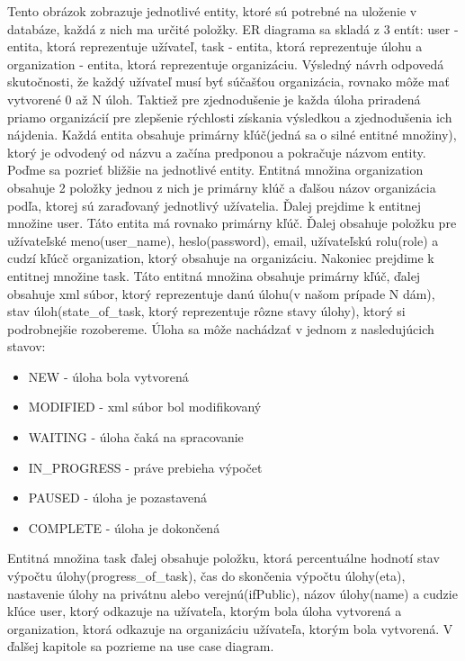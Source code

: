 Tento obrázok zobrazuje jednotlivé entity, ktoré sú potrebné na uloženie v databáze, každá z nich ma určité položky. ER diagrama sa skladá z 3 entít: user - entita, ktorá reprezentuje užívateľ, task - entita, ktorá reprezentuje úlohu a organization - entita, ktorá reprezentuje organizáciu. Výsledný návrh odpovedá skutočnosti, že každý užívateľ musí byť súčašťou organizácia, rovnako môže mať vytvorené 0 až N úloh. Taktiež pre zjednodušenie je každa úloha priradená priamo organizácií pre zlepšenie rýchlosti získania výsledkou a zjednodušenia ich nájdenia. Každá entita obsahuje primárny kľúč(jedná sa o silné entitné množiny), ktorý je odvodený od názvu a začína predponou  a pokračuje názvom entity. Poďme sa pozrieť bližšie na jednotlivé entity. Entitná množina organization obsahuje 2 položky jednou z nich je primárny klúč a ďalšou názov organizácia podľa, ktorej sú zaraďovaný jednotlivý užívatelia. Ďalej prejdime k entitnej množine user. Táto entita má rovnako primárny kľúč. Ďalej obsahuje položku pre užívateľské meno(user\_name), heslo(password), email, užívateľskú rolu(role) a cudzí kľúcč organization, ktorý obsahuje na organizáciu. Nakoniec prejdime k entitnej množine task. Táto entitná množina obsahuje primárny kľúč, ďalej obsahuje xml súbor, ktorý reprezentuje danú úlohu(v našom prípade N dám), stav úloh(state\_of\_task, ktorý reprezentuje rôzne stavy úlohy), ktorý si podrobnejšie rozobereme. Úloha sa môže nachádzať v jednom z nasledujúcich stavov:
\begin{itemize}
\item NEW - úloha bola vytvorená
\item MODIFIED - xml súbor bol modifikovaný
\item WAITING - úloha čaká na spracovanie
\item IN\_PROGRESS - práve prebieha výpočet
\item PAUSED - úloha je pozastavená
\item COMPLETE - úloha je dokončená
\end{itemize}
Entitná množina task ďalej obsahuje položku, ktorá percentuálne hodnotí stav výpočtu úlohy(progress\_of\_task), čas do skončenia výpočtu úlohy(eta), nastavenie úlohy na privátnu alebo verejnú(ifPublic), názov úlohy(name) a cudzie kľúce user, ktorý odkazuje na užívateľa, ktorým bola úloha vytvorená a organization, ktorá odkazuje na organizáciu užívateľa, ktorým bola vytvorená. V ďalšej kapitole sa pozrieme na use case diagram.



